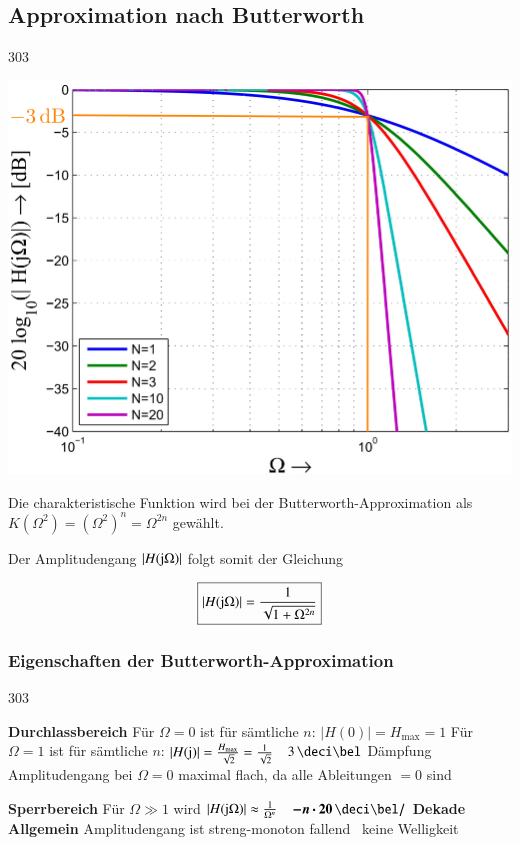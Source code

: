 \subsection{Approximation nach Butterworth}{303}

\begin{minipage}[c]{0.45\columnwidth}
    \includegraphics[width=\columnwidth]{images/filter_butterworth_amplitudengang.png}
\end{minipage}
\hfill
\begin{minipage}[c]{0.48\columnwidth}
    Die charakteristische Funktion wird bei der Butterworth-Approximation als\\
    $K(\Omega^2) = (\Omega^2)^n = \Omega^{2n}$ gewählt.

    Der Amplitudengang $|H(\mathrm{j} \Omega)|$ folgt somit der Gleichung

    $$\boxed{ |H(\mathrm{j} \Omega)| = \frac{1}{\sqrt{ 1 +\Omega^{2n}}} } $$
\end{minipage}


\subsubsection{Eigenschaften der Butterworth-Approximation}{303}

\begin{outline}
    \1 \textbf{Durchlassbereich}
        \2 Für $\Omega = 0$ ist für sämtliche $n$: $|H(0)| = H_{\max} = 1$
        \2 Für $\Omega = 1$ ist für sämtliche $n$: $|H(\mathrm{j})| = \frac{H_{\max}}{\sqrt{2}} = \frac{1}{\sqrt{2}}$
            \textrightarrow\ $3 \, \deci \bel$ Dämpfung
        \2 Amplitudengang bei $\Omega = 0$ maximal flach, da alle Ableitungen $=0$ sind

    \1 \textbf{Sperrbereich}
        \2 Für $\Omega \gg 1$ wird $|H(\mathrm{j} \Omega)| \approx \frac{1}{\Omega^n}$ 
            \textrightarrow\ $\bm{- n \cdot 20 \, \deci \bel /}$ \textbf{Dekade}
    \1 \textbf{Allgemein}
        \2 Amplitudengang ist streng-monoton fallend \textrightarrow\ keine Welligkeit
\end{outline}


